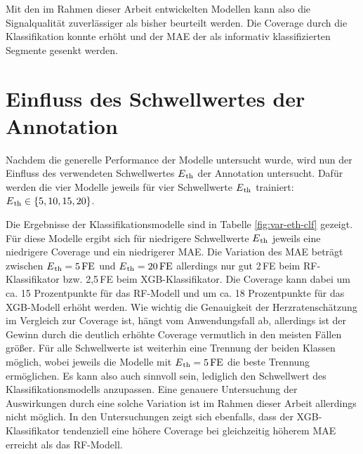  Mit den im Rahmen dieser Arbeit entwickelten Modellen kann also die Signalqualität zuverlässiger als bisher beurteilt werden. Die Coverage durch die Klassifikation konnte erhöht und der \ac{MAE} der als informativ klassifizierten Segmente gesenkt werden.

\section{Einfluss des Schwellwertes der Annotation}

Nachdem die generelle Performance der Modelle untersucht wurde, wird nun der Einfluss des verwendeten Schwellwertes $E\textsubscript{th}$ der Annotation untersucht. Dafür werden die vier Modelle jeweils für vier Schwellwerte $E\textsubscript{th}$ trainiert: $E\textsubscript{th} \in \{5, 10, 15, 20\}$.

Die Ergebnisse der Klassifikationsmodelle sind in Tabelle \ref{fig:var-eth-clf} gezeigt. Für diese Modelle ergibt sich für niedrigere Schwellwerte $E\textsubscript{th}$ jeweils eine niedrigere Coverage und ein niedrigerer \ac{MAE}. Die Variation des \ac{MAE} beträgt zwischen $E\textsubscript{th}= 5\,\si{FE}$ und $E\textsubscript{th} = 20\,\si{FE}$ allerdings nur gut 2\,\si{FE} beim \ac{RF}-Klassifikator bzw. 2,5\,\si{FE} beim \ac{XGB}-Klassifikator. Die Coverage kann dabei um ca. 15 Prozentpunkte für das \ac{RF}-Modell und um ca. 18 Prozentpunkte für das \ac{XGB}-Modell erhöht werden. Wie wichtig die Genauigkeit der Herzratenschätzung im Vergleich zur Coverage ist, hängt vom Anwendungsfall ab, allerdings ist der Gewinn durch die deutlich erhöhte Coverage vermutlich in den meisten Fällen größer. Für alle Schwellwerte ist weiterhin eine Trennung der beiden Klassen möglich, wobei jeweils die Modelle mit $E\textsubscript{th}= 5\text{\,}\si{FE}$ die beste Trennung ermöglichen. Es kann also auch sinnvoll sein, lediglich den Schwellwert des Klassifikationsmodells anzupassen. Eine genauere Untersuchung der Auswirkungen durch eine solche Variation ist im Rahmen dieser Arbeit allerdings nicht möglich. In den Untersuchungen zeigt sich ebenfalls, dass der \ac{XGB}-Klassifikator tendenziell eine höhere Coverage bei gleichzeitig höherem \ac{MAE} erreicht als das \ac{RF}-Modell.

